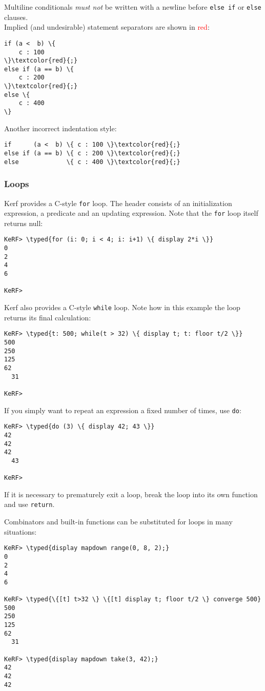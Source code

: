 \documentclass{article}
\newcommand{\typed}[1]{\textcolor{TealBlue}{#1}}
\begin{document}
Multiline conditionals \emph{must not} be written with a newline before \texttt{else if} or \texttt{else} clauses.\\
Implied (and undesirable) statement separators are shown in \textcolor{red}{red}:
\begin{Verbatim}
if (a <  b) \{
	c : 100
\}\textcolor{red}{;}
else if (a == b) \{
	c : 200
\}\textcolor{red}{;}
else \{
	c : 400
\}
\end{Verbatim}

Another incorrect indentation style:
\begin{Verbatim}
if      (a <  b) \{ c : 100 \}\textcolor{red}{;}
else if (a == b) \{ c : 200 \}\textcolor{red}{;}
else             \{ c : 400 \}\textcolor{red}{;}
\end{Verbatim}

\pagebreak
\subsubsection{Loops}
Kerf provides a C-style \texttt{for} loop. The header consists of an initialization expression, a predicate and an updating expression. Note that the \texttt{for} loop itself returns null:
\begin{Verbatim}
KeRF> \typed{for (i: 0; i < 4; i: i+1) \{ display 2*i \}}
0
2
4
6
  
KeRF> 
\end{Verbatim}

Kerf also provides a C-style \texttt{while} loop. Note how in this example the loop returns its final calculation:
\begin{Verbatim}
KeRF> \typed{t: 500; while(t > 32) \{ display t; t: floor t/2 \}}
500
250
125
62
  31
  
KeRF>
\end{Verbatim}

If you simply want to repeat an expression a fixed number of times, use \texttt{do}:
\begin{Verbatim}
KeRF> \typed{do (3) \{ display 42; 43 \}}
42
42
42
  43

KeRF>
\end{Verbatim}

If it is necessary to prematurely exit a loop, break the loop into its own function and use \texttt{return}.

\vspace{0.5cm}

Combinators and built-in functions can be substituted for loops in many situations:
\begin{Verbatim}
KeRF> \typed{display mapdown range(0, 8, 2);}
0
2
4
6

KeRF> \typed{\{[t] t>32 \} \{[t] display t; floor t/2 \} converge 500}
500
250
125
62
  31

KeRF> \typed{display mapdown take(3, 42);}
42
42
42
\end{Verbatim}
\end{document}
